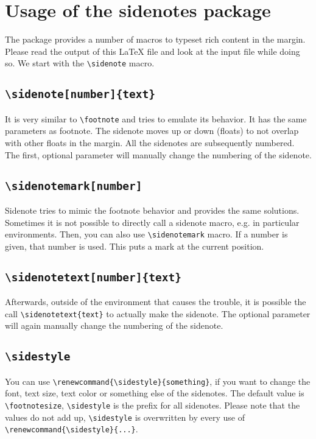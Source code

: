 \documentclass{book}
\begin{document}
%
\chapter{Usage of the \textbf{sidenotes} package}
The package provides a number of macros to typeset rich content in the margin. Please read the output of this \LaTeX{} file and look at the input file while doing so. We start with the \verb+\sidenote+ macro. 

\section{\texttt{\textbackslash sidenote[number]\{text\}}}
It is very similar to \verb+\footnote+ and tries to emulate its behavior. It has the same parameters as footnote. The sidenote moves up or down (floats) to not overlap with other floats in the margin. All the sidenotes are subsequently numbered. The first, optional parameter will manually change the numbering of the sidenote.

\section{\texttt{\textbackslash sidenotemark[number]}}
Sidenote tries to mimic the footnote behavior and provides the same solutions. Sometimes it is not possible to directly call a sidenote macro, e.g. in particular environments. Then, you can also use \verb+\sidenotemark+ macro.\sidenotemark{} If a number is given, that number is used.\sidenotemark[99]{} This puts a mark at the current position. 

\section{\texttt{\textbackslash sidenotetext[number]\{text\}}}
Afterwards, outside of the environment that causes the trouble, it is possible the call \verb+\sidenotetext{text}+ to actually make the sidenote. The optional parameter will again manually change the numbering of the sidenote.

\section{\texttt{\textbackslash sidestyle}}
\renewcommand{\sidestyle}{\raggedright\footnotesize}
You can use \verb+\renewcommand{\sidestyle}{something}+, if you want to change the font, text size, text color or something else of the sidenotes.
\renewcommand{\sidestyle}{\footnotesize\em}
The default value is \verb+\footnotesize+, \verb+\sidestyle+ is the prefix for all sidenotes. Please note that the values do not add up, \verb+\sidestyle+ is overwritten by every use of \verb+\renewcommand{\sidestyle}{...}+.%
\renewcommand{\sidestyle}{\footnotesize}%
\end{document}
